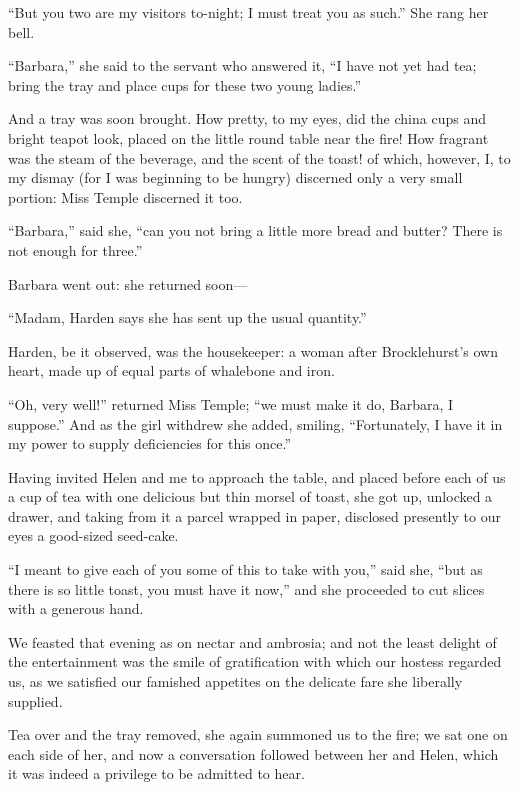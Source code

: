 \enquote{But you two are my visitors to-night; I must treat you as
such.} She rang her bell.

\enquote{Barbara,} she said to the servant who answered it, \enquote{I
have not yet had tea; bring the tray and place cups for these two young
ladies.}

And a tray was soon brought. How pretty, to my eyes, did the china cups
and bright teapot look, placed on the little round table near the fire! 
How fragrant was the steam of the beverage, and the scent of the toast!
of which, however, I, to my dismay (for I was beginning to be hungry)
discerned only a very small portion: Miss Temple discerned it too.

\enquote{Barbara,} said she, \enquote{can you not bring a little more
bread and butter? There is not enough for three.}

Barbara went out: she returned soon---

\enquote{Madam, \Mrs{} Harden says she has sent up the usual quantity.}

\Mrs{} Harden, be it observed, was the housekeeper: a woman after \Mr{}
Brocklehurst's own heart, made up of equal parts of whalebone and iron.

\enquote{Oh, very well!} returned Miss Temple; \enquote{we must make it
do, Barbara, I suppose.} And as the girl withdrew she added, smiling,
\enquote{Fortunately, I have it in my power to supply deficiencies for
this once.}

Having invited Helen and me to approach the table, and placed before
each of us a cup of tea with one delicious but thin morsel of toast, she
got up, unlocked a drawer, and taking from it a parcel wrapped in paper,
disclosed presently to our eyes a good-sized seed-cake.

\enquote{I meant to give each of you some of this to take with you,}
said she, \enquote{but as there is so little toast, you must have it
now,} and she proceeded to cut slices with a generous hand.

We feasted that evening as on nectar and ambrosia; and not the least
delight of the entertainment was the smile of gratification with which
our hostess regarded us, as we satisfied our famished appetites on the
delicate fare she liberally supplied.

Tea over and the tray removed, she again summoned us to the fire; we sat
one on each side of her, and now a conversation followed between her and
Helen, which it was indeed a privilege to be admitted to hear.

